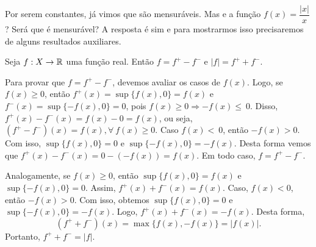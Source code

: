     \begin{figure}[h!]
	\centering
    \end{figure}    

Por serem constantes, já vimos que são mensuráveis.
Mas e a função $f(x) =\dfrac{|x|}{x}$? Será que é mensurável?
A resposta é sim e para mostrarmos isso precisaremos de alguns resultados auxiliares. 
    \begin{lemma}
    \label{lem:f = f^+ - f^-}
        Seja $f: X \to \mathbb{R}$ uma função real. Então $f = f^+ - f^-$ e $|f| = f^+ + f^-$.
    \end{lemma}
    \begin{prova}
            Para provar que $f = f^+ - f^-$, devemos avaliar os casos de $f(x)$. 
            Logo, se $f(x) \geq 0$, então $f^+(x) = \sup\{f(x), 0\} = f(x)$ e $f^-(x) = \sup\{-f(x), 0\} = 0$, pois $f(x) \geq 0 \Rightarrow  - f(x) \leq~0$.
            Disso, $f^+(x) - f^-(x) = f(x) - 0 = f(x)$, ou seja, $(f^+ - f^-)(x) = f(x),  \forall \ f(x) \geq 0$.
            Caso $f(x) <~0$, então $- f(x) > 0$. 
            Com isso,  $\sup\{f(x), 0\} = 0$ e $\sup\{-f(x), 0\} = -f(x)$.
            Desta forma vemos que
            $f^+(x) - f^-(x) = 0 - (-f(x)) = f(x)$.
            Em todo caso, $f = f^+ - f^-$.

            Analogamente, se $f(x) \geq 0$, então  $\sup\{f(x), 0\} = f(x)$ e $\sup\{-f(x), 0\} = 0$.
            Assim, $f^+(x) + f^-(x) = f(x)$.
            Caso, $f(x) < 0$, então $ - f(x) > 0$.
            Com isso, obtemos $\sup\{f(x), 0\} = 0$ e $\sup\{-f(x), 0\} = -f(x)$.
            Logo, $f^+(x) + f^-(x) = -f(x)$.
            Desta forma, 
            $$
            (f^+ + f^-)(x) = \max\{f(x), -f(x)\} = |f(x)|.
            $$
            Portanto, $f^+ + f^- = |f|$.
    \end{prova}

